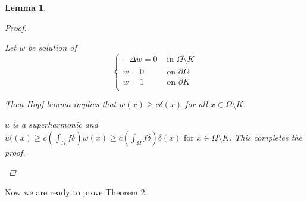 \documentclass[paper=a4, fontsize=11pt]{scrartcl} %
\numberwithin{equation}{section} %
\numberwithin{figure}{section} %
\numberwithin{table}{section} %
\newtheorem{lemma}{Lemma}
\numberwithin{exercise}{section}
\begin{document}
\begin{lemma}
\begin{proof}
\begin{itemize}
Let $w$ be solution of $$\begin{cases} -\Delta w=0 &\mbox{ in } \Omega\setminus K\\
w=0 & \mbox{ on } \partial\Omega\\
w=1 & \mbox{ on } \partial K\\
\end{cases}$$

Then Hopf lemma implies that $w(x)\geq c\delta(x)$ for all $x\in \Omega\setminus K$.

$u$ is a superharmonic and $u((x)\geq c\left(\int_{\Omega} f\delta \right) w(x)\geq c\left(\int_{\Omega} f\delta \right)\delta(x)\mbox{ for } x\in \Omega\setminus K.$
This completes the proof.
 \end{itemize}
 \end{proof}
\end{lemma}
Now we are ready to prove Theorem 2:
\end{document}
